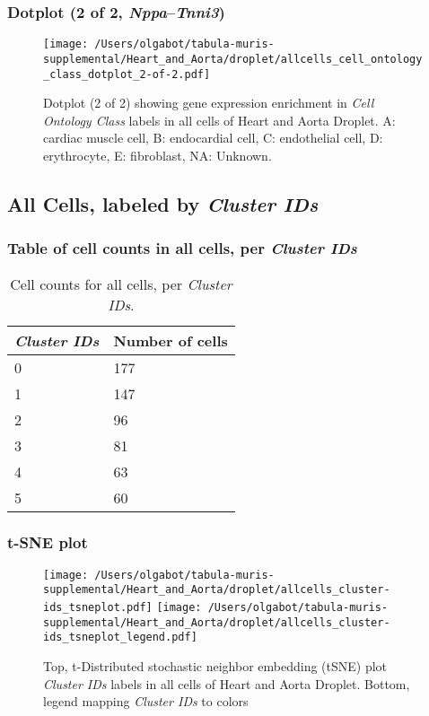 \clearpage

\subsubsection{Dotplot (2 of 2, \emph{Nppa}--\emph{Tnni3})}
\begin{figure}[h]
\centering
\texttt{[image: /Users/olgabot/tabula-muris-supplemental/Heart\_and\_Aorta/droplet/allcells\_cell\_ontology\_class\_dotplot\_2-of-2.pdf]}

\caption{ Dotplot (2 of 2)  showing gene expression enrichment in \emph{Cell Ontology Class} labels in all cells of Heart and Aorta Droplet. A: cardiac muscle cell, B: endocardial cell, C: endothelial cell, D: erythrocyte, E: fibroblast, NA: Unknown.}
\end{figure}


\clearpage

\subsection{All Cells, labeled by \emph{Cluster IDs}}
\subsubsection{Table of cell counts in all cells, per \emph{Cluster IDs}}\begin{table}[h]
\centering
\label{my-label}
\begin{tabular}{@{}ll@{}}
\toprule

\emph{Cluster IDs}& Number of cells \\ \midrule
0 & 177 \\

1 & 147 \\

2 & 96 \\

3 & 81 \\

4 & 63 \\

5 & 60 \\
\bottomrule
\end{tabular}
\caption{Cell counts for all cells, per \emph{Cluster IDs}.}
\end{table}

\clearpage
\subsubsection{t-SNE plot}
\begin{figure}[h]
\centering
\texttt{[image: /Users/olgabot/tabula-muris-supplemental/Heart\_and\_Aorta/droplet/allcells\_cluster-ids\_tsneplot.pdf]}
\texttt{[image: /Users/olgabot/tabula-muris-supplemental/Heart\_and\_Aorta/droplet/allcells\_cluster-ids\_tsneplot\_legend.pdf]}
\caption{Top, t-Distributed stochastic neighbor embedding (tSNE) plot  \emph{Cluster IDs} labels in all cells of Heart and Aorta Droplet. Bottom, legend mapping \emph{Cluster IDs} to colors}
\end{figure}


